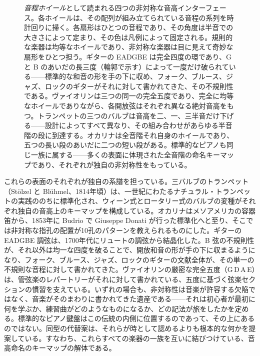 \documentclass[10pt,letterpaper,twocolumn]{article}
\begin{document}
\begin{figure}[t]
{}
\endgroup
\caption{\emph{音程ホイール}として読まれる四つの非対称な音高インターフェース。各ホイールは、その配列が組み立てられている音程の系列を時計回りに掃く。各扇形はひとつの音程であり、その角度は半音での大きさによって定まり、その色は凡例によって固定される。規則的な楽器は均等なホイールであり、非対称な楽器は目に見えて奇妙な扇形をひとつ担う。ギターの EADGBE は完全四度の環であり、G と B のあいだの長三度（輪郭で示す）によって一度だけ破られている——標準的な和音の形を手の下に収め、フォーク、ブルース、ジャズ、ロックのギターがそれに対して書かれてきた、その不規則性である。ヴァイオリンは三つの同一の完全五度であり、完全に均等なホイールでありながら、各開放弦はそれぞれ異なる絶対音高をもつ。トランペットの三つのバルブは音高を二、一、三半音だけ下げる——設計によってすべて異なり、その組み合わせがあらゆる半音階の段に到達する。オカリナは全音階それ自身のホイールであり、五つの長い段のあいだに二つの短い段がある。標準的なピアノも同じ一族に属する——多くの表面に体現された全音階の命名キーマップであり、それぞれが独自の非対称性をもっている。}
\label{fig:asymmetric-instruments}
\end{figure}

これらの表面のそれぞれが独自の系譜を担っている。三バルブのトランペット（Stölzel と Blühmel、1814年頃）は、一世紀にわたるナチュラル・トランペットの実践ののちに標準化され、ウィーン式とロータリー式のバルブの変種がそれぞれ独自の音高上のキーマップを構成している。オカリナはメソアメリカの容器笛から、1853年に Budrio で Giuseppe Donati が行った標準化へと至り、そこでは非対称な指孔の配置が10孔のパターンを教えられるものにした。ギターの EADGBE 調弦は、1700年代にリュートの調弦から結晶化した。B 弦の不規則性が、それ以外は均一な四度を破ることで、開放和音の形が手の下に収まるようになり、フォーク、ブルース、ジャズ、ロックのギターの文献全体が、その単一の不規則な音程に対して書かれてきた。ヴァイオリンの厳密な完全五度（G\,D\,A\,E）は、管弦楽のレパートリーがそれに対して書かれている、五度に基づく弦楽セクションの慣習を支えている。いずれの場合も、非対称性は音楽が許容する欠陥ではなく、音楽がそのまわりに書かれてきた遺産である——それは初心者が最初に何を学ぶか、練習曲がどのようなものになるか、どの記法が旅をしたかを定める。標準的なピアノ鍵盤はこの伝統の内側に位置するのであって、その上にあるのではない。同型の代替案は、それらが時として認めるよりも根本的な何かを提案している。すなわち、これらすべての楽器の一族を互いに結びつけている、音高命名のキーマップの解体である。
\end{document}
